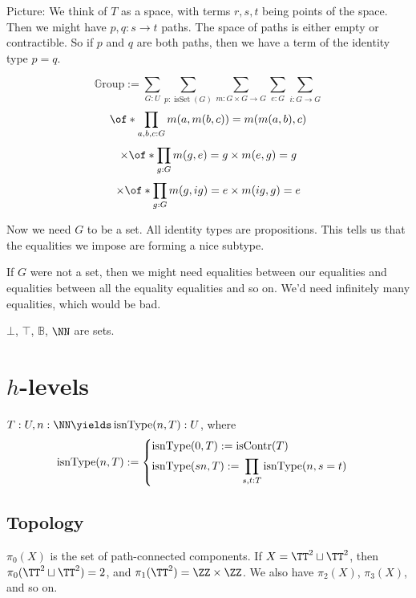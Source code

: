 \documentclass{article}
\newcommand\pred[1]{\operatorname{#1}}
\newcommand\BB{\mathbb{B}}
\newcommand\isContr{\pred{isContr}}
\newcommand\isSet{\pred{isSet}}
\newcommand\GroupT{\mathbb{G}\mathrm{roup}}
\newcommand\isnType{\pred{isnType}}
\begin{document}
Picture: We think of $T$ as a space, with terms $r,s,t$ being 
points of the space. Then we might have $p,q:s\to t$ paths.
The space of paths is either empty or contractible. So if 
$p$ and $q$ are both paths, then we have a term of the identity 
type $p=q$.

\begin{example}[Groups]
    \[\GroupT := 
    \sum_{G:U}
    \sum_{p:\isSet(G)}
    \sum_{m:G\times G\to G}
    \sum_{e:G}
    \sum_{i:G\to G}
    \]
    \[
    \of*{
    \prod_{a,b,c:G}
    m(a,m(b,c)) = m(m(a,b),c)
    }
    \]
    \[
    \times 
    \of*{
    \prod_{g:G}
    m(g,e) = g \times m(e,g) = g
    }
    \]
    \[
    \times 
    \of*{
        \prod_{g:G}
        m(g,i g) = e
        \times 
        m(i g,g) = e
    }
    \]

    Now we need $G$ to be a set.
    All identity types are propositions. This tells us that 
    the equalities we impose are forming a nice subtype.

    If $G$ were not a set, then we might need equalities between
    our equalities and equalities between all the equality 
    equalities and so on. We'd need infinitely many 
    equalities, which would be bad.
\end{example}

\begin{proposition}
    $\bot$, $\top$, $\BB$, $\NN$ are sets.
\end{proposition}

\section{$h$-levels}

\begin{definition}
$T:U,n:\NN\yields \isnType(n,T):U$, where
\[ \isnType(n,T) :=
\begin{dcases}
    \isnType(0,T) := \isContr(T) &\\
    \isnType(sn,T) := \prod_{s,t:T} \isnType(n,s=t) &
\end{dcases}\]
\end{definition}

\subsection{Topology}

$\pi_0(X)$ is the set of path-connected components.
If $X=\TT^2\sqcup\TT^2$,
then $\pi_0(\TT^2\sqcup \TT^2) = 2$,
and $\pi_1(\TT^2) = \ZZ\times \ZZ$.
We also have $\pi_2(X)$, $\pi_3(X)$, and so on.
\end{document}
